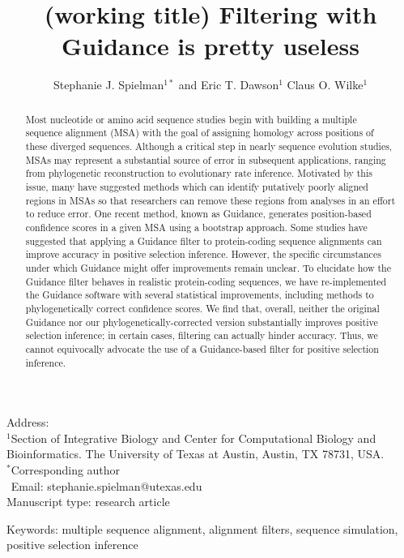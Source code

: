 \documentclass[10pt]{article}
\begin{document}
\title{\textbf{(working title) Filtering with Guidance is pretty useless}}
\author{Stephanie J. Spielman$^{1*}$ and Eric T. Dawson$^{1}$ Claus O. Wilke$^{1}$}
\date{}

\maketitle
\noindent
Address:\\
$^1$Section of Integrative Biology and Center for Computational Biology and Bioinformatics. The University
of Texas at Austin, Austin, TX 78731, USA.\\

\bigskip
\noindent
$^*$Corresponding author\\
$\phantom{^*}$Email: stephanie.spielman@utexas.edu\\

\bigskip
\noindent
Manuscript type: research article

\bigskip
\noindent Keywords: multiple sequence alignment, alignment filters, sequence simulation, positive selection inference

\newpage
\begin{abstract}
	Most nucleotide or amino acid sequence studies begin with building a multiple sequence alignment (MSA) with the goal of assigning homology across positions of these diverged sequences. Although a critical step in nearly sequence evolution studies, MSAs may represent a substantial source of error in subsequent applications, ranging from phylogenetic reconstruction to evolutionary rate inference. Motivated by this issue, many have suggested methods which can identify putatively poorly aligned regions in MSAs so that researchers can remove these regions from analyses in an effort to reduce error. One recent method, known as Guidance, generates position-based confidence scores in a given MSA using a bootstrap approach. Some studies have suggested that applying a Guidance filter to protein-coding sequence alignments can improve accuracy in positive selection inference. However, the specific circumstances under which Guidance might offer improvements remain unclear. To elucidate how the Guidance filter behaves in realistic protein-coding sequences, we have re-implemented the Guidance software with several statistical improvements, including methods to phylogenetically correct confidence scores. We find that, overall, neither the original Guidance nor our phylogenetically-corrected version substantially improves positive selection inference; in certain cases, filtering can actually hinder accuracy. Thus, we cannot equivocally advocate the use of a Guidance-based filter for positive selection inference.
\end{abstract}
\end{document}

